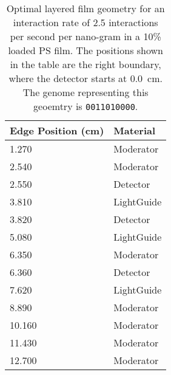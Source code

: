 \begin{table}
	\caption[Optimal Layered Film Geometry for 2.5 interaction per second per nanogram Cf-252]{Optimal layered film geometry for an interaction rate of 2.5 interactions per second per nano-gram  in a 10\%  loaded PS film. The positions shown in the table are the right boundary, where the detector starts at \SI{0.0}{\cm}. The genome representing this geoemtry is \texttt{0011010000}.}
	\label{tab:OptGeoDetailed25}
	\begin{tabular}{m{3cm} m{4cm}}
	\toprule
	Edge Position (\si{\cm}) & Material \\
	\midrule
1.270&Moderator\\
2.540&Moderator\\
2.550&Detector\\
3.810&LightGuide\\
3.820&Detector\\
5.080&LightGuide\\
6.350&Moderator\\
6.360&Detector\\
7.620&LightGuide\\
8.890&Moderator\\
10.160&Moderator\\
11.430&Moderator\\
12.700&Moderator\\
	\bottomrule
	\end{tabular}
\end{table}